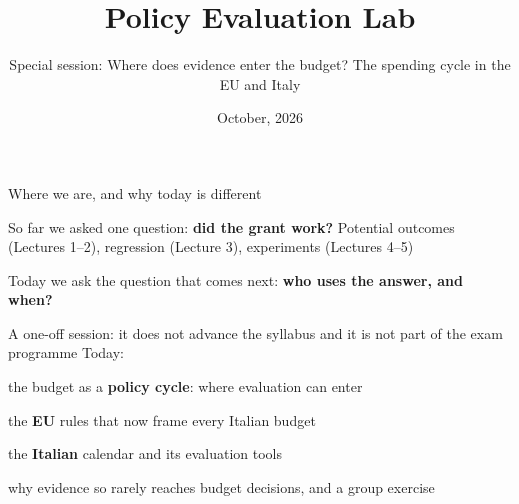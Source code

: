 \documentclass[aspectratio=169,xcolor=table]{beamer}
\title[Policy Evaluation Lab]{Policy Evaluation Lab}
\subtitle[Special session]{Special session: Where does evidence enter the budget? The spending cycle in the EU and Italy}
\date[\pelYear]{October, 2026}
\begin{document}
\frame{\titlepage}

\begin{frame}{Where we are, and why today is different}
\bi
  \item So far we asked one question: \textbf{did the grant work?} Potential outcomes (Lectures 1--2), regression (Lecture 3), experiments (Lectures 4--5)
  \item Today we ask the question that comes next: \textbf{who uses the answer, and when?}
  \item A one-off session: it does not advance the syllabus and it is not part of the exam programme
\ei
\vspace{0.1cm}
Today:
\be
  \item the budget as a \textbf{policy cycle}: where evaluation can enter
  \item the \textbf{EU} rules that now frame every Italian budget
  \item the \textbf{Italian} calendar and its evaluation tools
  \item why evidence so rarely reaches budget decisions, and a group exercise
\ee
{}
\end{frame}
\end{document}
